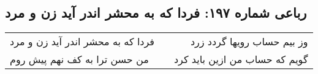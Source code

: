 \begin{center}
\section*{رباعی شماره ۱۹۷: فردا که به محشر اندر آید زن و مرد}
\label{sec:sh197}
\begin{longtable}{l p{0.5cm} r}
فردا که به محشر اندر آید زن و مرد
&&
وز بیم حساب رویها گردد زرد
\\
من حسن ترا به کف نهم پیش روم
&&
گویم که حساب من ازین باید کرد
\\
\end{longtable}
\end{center}
